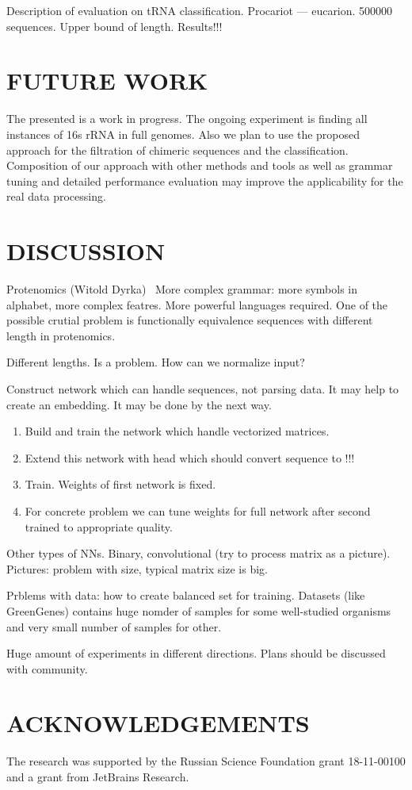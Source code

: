\documentclass[a4paper,twoside]{article}
\begin{document}
Description of evaluation on tRNA classification.
Procariot --- eucarion.
500000 sequences.
Upper bound of length.
Results!!!

\section{\uppercase{Future Work}}
\label{sec:FutureWork}

\noindent The presented is a work in progress. 
The ongoing experiment is finding all instances of 16s rRNA in full genomes.
Also we plan to use the proposed approach for the filtration of chimeric sequences and the classification.
Composition of our approach with other methods and tools as well as grammar tuning and detailed performance evaluation may improve the applicability for the real data processing.


\section{\uppercase{Discussion}}
\label{sec:Discussion}

Protenomics (Witold Dyrka)~\cite{DBLP:Witold:Proteins}
More complex grammar: more symbols in alphabet, more complex featres.
More powerful languages required.
One of the possible crutial problem is functionally equivalence sequences with different length in protenomics.

Different lengths. Is a problem.
How can we normalize input?

Construct network which can handle sequences, not parsing data.
It may help to create an embedding.
It may be done by the next way.
\begin{enumerate}
\item Build and train the network which handle vectorized matrices.
\item Extend this network with head which should convert sequence to !!!
\item Train. Weights of first network is fixed.
\item For concrete problem we can tune weights for full network after second trained to appropriate quality.
\end{enumerate}

Other types of NNs.
Binary, convolutional (try to process matrix as a picture).
Pictures: problem with size, typical matrix size is big.

Prblems with data: how to create balanced set for training.
Datasets (like GreenGenes) contains huge nomder of samples for some well-studied organisms and very small number of samples for other.

Huge amount of experiments in different directions.
Plans should be discussed with community.


\section*{\uppercase{Acknowledgements}}

\noindent The research was supported by the Russian Science Foundation grant 18-11-00100 and a grant from JetBrains Research.


\vfill

{\small
}


\vfill
\end{document}
